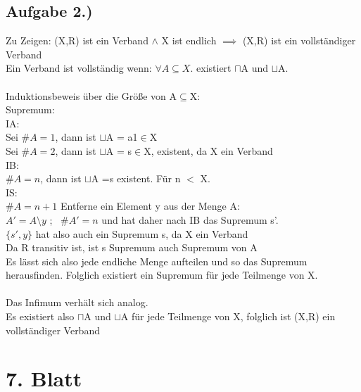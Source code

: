 \documentclass[10pt,a4paper,german,landscape,fleqn]{article} \usepackage[utf8]{inputenc} %
\begin{document}
\subsection*{Aufgabe 2.)}
Zu Zeigen: (X,R) ist ein Verband $ \land $ X ist endlich $\implies$  (X,R) ist ein vollständiger Verband \\
Ein Verband ist vollständig wenn:  $\forall A \subseteq X.$ existiert $\sqcap$A und $\sqcup$A. \\ \\
Induktionsbeweis über die Größe von A$\subseteq$X:\\
Supremum: \\
IA: \\
Sei $\#A=1$, dann ist $\sqcup$A = a1$\in$X \\
Sei $\#A=2$, dann ist $\sqcup$A = s$\in$X, existent, da X ein Verband\\
IB:\\
$\#A=n$, dann ist $\sqcup$A =s existent. Für n $<$ X. \\
IS: \\
$\#A=n+1$ Entferne ein Element y aus der Menge A: \\
$A'=A\setminus y$  ; \ $\#A'=n$ und hat daher nach IB das Supremum s'. \\
$\{ s',y \} $ hat also auch ein Supremum s, da X ein Verband \\
Da R transitiv ist, ist s Supremum auch Supremum von A  \\
Es lässt sich also jede endliche Menge aufteilen und so das Supremum herausfinden. Folglich existiert ein Supremum für jede Teilmenge von X. \\ \\
Das Infimum verhält sich analog. \\
Es existiert also $\sqcap$A und $\sqcup$A für jede Teilmenge von X, folglich ist (X,R) ein vollständiger Verband

\newpage
\section*{7. Blatt } %
\end{document}
